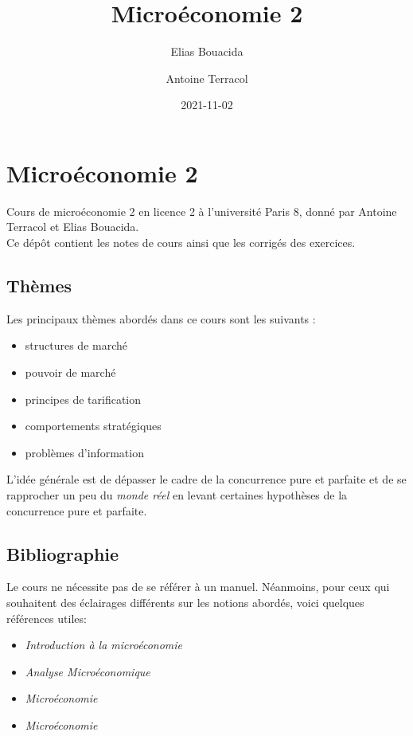 \documentclass[
]{book}
\title{Microéconomie 2}
\author{Elias Bouacida \and Antoine Terracol}
\date{2021-11-02}
\providecommand{\tightlist}{%
  \setlength{\itemsep}{0pt}\setlength{\parskip}{0pt}}
\theoremstyle{definition}
\theoremstyle{definition}
\theoremstyle{definition}
\theoremstyle{definition}
\theoremstyle{remark}
\begin{document}
\maketitle

{
\setcounter{tocdepth}{1}
\tableofcontents
}
\hypertarget{microuxe9conomie-2}{%
\chapter{Microéconomie 2}\label{microuxe9conomie-2}}

Cours de microéconomie 2 en licence 2 à l'université Paris 8, donné par Antoine Terracol et Elias Bouacida.\\
Ce dépôt contient les notes de cours ainsi que les corrigés des exercices.

\hypertarget{thuxe8mes}{%
\section{Thèmes}\label{thuxe8mes}}

Les principaux thèmes abordés dans ce cours sont les suivants :

\begin{itemize}
\tightlist
\item
  structures de marché
\item
  pouvoir de marché
\item
  principes de tarification
\item
  comportements stratégiques
\item
  problèmes d'information
\end{itemize}

L'idée générale est de dépasser le cadre de la concurrence pure et parfaite et de se rapprocher un peu du \emph{monde réel} en levant certaines hypothèses de la concurrence pure et parfaite.

\hypertarget{bibliographie}{%
\section{Bibliographie}\label{bibliographie}}

Le cours ne nécessite pas de se référer à un manuel.
Néanmoins, pour ceux qui souhaitent des éclairages différents sur les notions abordés, voici quelques références utiles:

\begin{itemize}
\tightlist
\item
  \citet{varian2015} \emph{Introduction à la microéconomie}
\item
  \citet{varian2008} \emph{Analyse Microéconomique}
\item
  \citet{pindyck2012} \emph{Microéconomie}
\item
  \citet{jeleva2014} \emph{Microéconomie}
\end{itemize}
\end{document}
